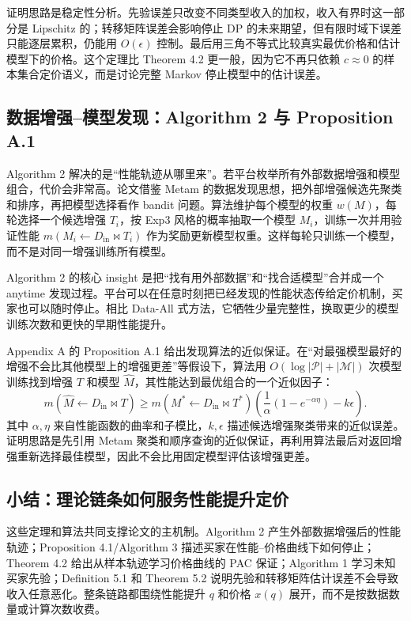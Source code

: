 \documentclass[11pt,a4paper]{ctexart}
\theoremstyle{definition}
\begin{document}
证明思路是稳定性分析。先验误差只改变不同类型收入的加权，收入有界时这一部分是 Lipschitz 的；转移矩阵误差会影响停止 DP 的未来期望，但有限时域下误差只能逐层累积，仍能用 $O(\epsilon)$ 控制。最后用三角不等式比较真实最优价格和估计模型下的价格。这个定理比 Theorem 4.2 更一般，因为它不再只依赖 $c\approx0$ 的样本集合定价语义，而是讨论完整 Markov 停止模型中的估计误差。

\subsection{数据增强--模型发现：Algorithm 2 与 Proposition A.1}

Algorithm 2 解决的是“性能轨迹从哪里来”。若平台枚举所有外部数据增强和模型组合，代价会非常高。论文借鉴 Metam 的数据发现思想，把外部增强候选先聚类和排序，再把模型选择看作 bandit 问题。算法维护每个模型的权重 $w(M)$，每轮选择一个候选增强 $T_i$，按 Exp3 风格的概率抽取一个模型 $M_i$，训练一次并用验证性能 $m(M_i\leftarrow D_{\mathrm{in}}\Join T_i)$ 作为奖励更新模型权重。这样每轮只训练一个模型，而不是对同一增强训练所有模型。

Algorithm 2 的核心 insight 是把“找有用外部数据”和“找合适模型”合并成一个 anytime 发现过程。平台可以在任意时刻把已经发现的性能状态传给定价机制，买家也可以随时停止。相比 Data-All 式方法，它牺牲少量完整性，换取更少的模型训练次数和更快的早期性能提升。

Appendix A 的 Proposition A.1 给出发现算法的近似保证。在“对最强模型最好的增强不会比其他模型上的增强更差”等假设下，算法用 $O(\log|\mathcal P|+|\mathcal M|)$ 次模型训练找到增强 $T$ 和模型 $\widehat M$，其性能达到最优组合的一个近似因子：
\[
m(\widehat M\leftarrow D_{\mathrm{in}}\Join T)\ge
m(M^*\leftarrow D_{\mathrm{in}}\Join T^*)
\left(\frac{1}{\alpha}(1-e^{-\alpha\eta})-k\epsilon\right).
\]
其中 $\alpha,\eta$ 来自性能函数的曲率和子模比，$k,\epsilon$ 描述候选增强聚类带来的近似误差。证明思路是先引用 Metam 聚类和顺序查询的近似保证，再利用算法最后对返回增强重新选择最佳模型，因此不会比用固定模型评估该增强更差。

\subsection{小结：理论链条如何服务性能提升定价}

这些定理和算法共同支撑论文的主机制。Algorithm 2 产生外部数据增强后的性能轨迹；Proposition 4.1/Algorithm 3 描述买家在性能--价格曲线下如何停止；Theorem 4.2 给出从样本轨迹学习价格曲线的 PAC 保证；Algorithm 1 学习未知买家先验；Definition 5.1 和 Theorem 5.2 说明先验和转移矩阵估计误差不会导致收入任意恶化。整条链路都围绕性能提升 $q$ 和价格 $x(q)$ 展开，而不是按数据数量或计算次数收费。
\end{document}
